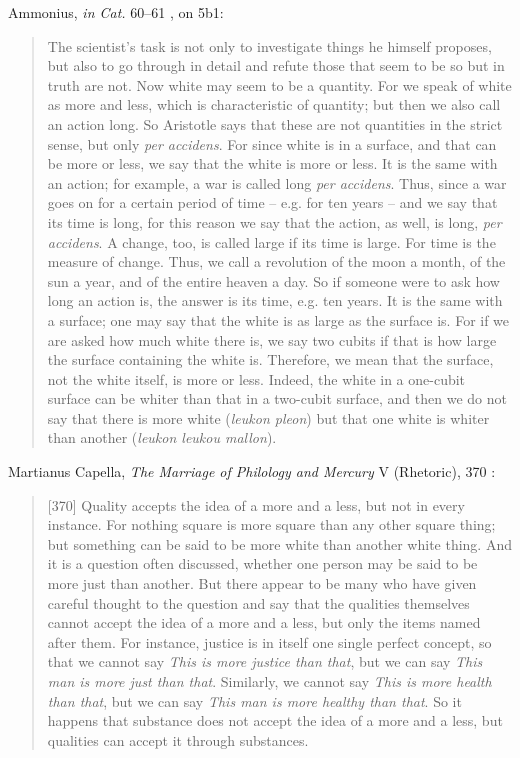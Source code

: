 \documentclass{amsart}
\theoremstyle{definition}
\begin{document}
Ammonius, {\em in Cat.} 60--61 \cite[p.~71]{ammonius}, on 5b1:

\begin{quote}
The scientist's task is not only to investigate things he himself
proposes, but also to go through in detail and refute those that
seem to be so but in truth are not. Now white may seem to be a
quantity. For we speak of white as more and less, which is
characteristic of quantity; but then we also call an action long.
So Aristotle says that these are not quantities in the strict
sense, but only {\em per accidens}. For since white is in a surface,
and that can be more or less, we say that the white is more or
less. It is the same with an action; for example, a war is called
long {\em per accidens}. Thus, since a war goes on for a certain
period of time -- e.g. for ten years -- and we say that its time is
long, for this reason we say that the action, as well, is long, {\em per
accidens}. A change, too, is called large if its time is large. For
time is the measure of change. Thus, we call a revolution of
the moon a month, of the sun a year, and of the entire heaven
a day. So if someone were to ask how long an action is, the
answer is its time, e.g. ten years. It is the same with a surface;
one may say that the white is as large as the surface is. For if
we are asked how much white there is, we say two cubits if
that is how large the surface containing the white is.
Therefore, we mean that the surface, not the white itself, is
more or less. Indeed, the white in a one-cubit surface can be
whiter than that in a two-cubit surface, and then we do not
say that there is more white ({\em leukon pleon}) but that one white
is whiter than another ({\em leukon leukou mallon}).
\end{quote}

Martianus Capella, {\em The Marriage of Philology and Mercury} V (Rhetoric), 370 \cite[p.~124]{capellaII}:

\begin{quote}
[370] Quality accepts the idea of a more and
a less, but not in every instance. For nothing square is more square
than any other square thing; but something can be said to be more
white than another white thing. And it is a question often discussed,
whether one person may be said to be more just than another.
But there appear to be many who have given careful thought to the
question and say that the qualities themselves cannot accept the idea
of a more and a less, but only the items named after them. For instance,
justice is in itself one single perfect concept, so that we
cannot say {\em This is more justice than that}, but we can say {\em This man
is more just than that}. Similarly, we cannot say {\em This is more health
than that}, but we can say {\em This man is more healthy than that}. So it
happens that substance does not accept the idea of a more and a less,
but qualities can accept it through substances. 
\end{quote}
\end{document}
